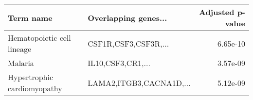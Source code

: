 \begin{tabular}{llr}
\toprule
                  Term name &    Overlapping genes... &  Adjusted p-value \\
\midrule
 Hematopoietic cell lineage &    CSF1R,CSF3,CSF3R,... &          6.65e-10 \\
                    Malaria &       IL10,CSF3,CR1,... &          3.57e-09 \\
Hypertrophic cardiomyopathy & LAMA2,ITGB3,CACNA1D,... &          5.12e-09 \\
\bottomrule
\end{tabular}
